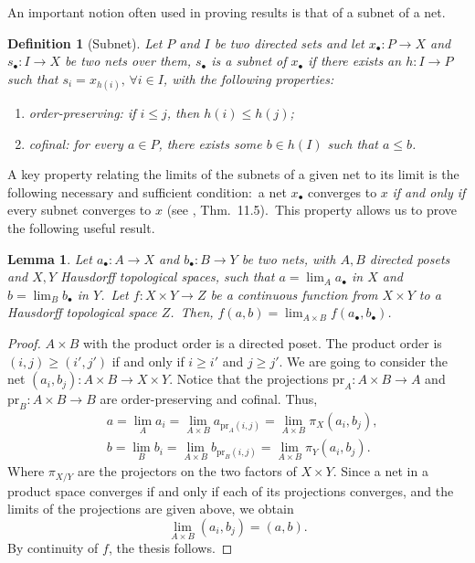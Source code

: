 \documentclass[11pt]{article}
\newtheorem{lemma}[proposition]{Lemma}
\newtheorem{definition}{Definition}[section]
\theoremstyle{definition}
\numberwithin{equation}{section}
\begin{document}
An important notion often used in proving results is that of a subnet of a net.
 \begin{definition}[Subnet]
 \label{def:subnet}
     Let $P$ and $I$ be two directed sets and let $x_{\bullet}:P\to X$ and $s_{\bullet}:I\to X$ be two nets over them, $s_{\bullet}$ is a \emph{subnet} of $x_{\bullet}$ if there exists an $h:I\to P$ such that $s_i=x_{h(i)},\,\forall i\in I$, with the following properties:
     \begin{enumerate}
         \item\emph{order-preserving:} if $i\leq j$, then $h(i)\leq h(j)$;
         \item\emph{cofinal:} for every $a\in P$, there exists some $b\in h(I)$ such that $a\leq b$.
     \end{enumerate}
 \end{definition}

 \noindent
 A key property relating the limits of the subnets of a given net to its limit is the following necessary and sufficient condition:~a net $x_{\bullet}$ converges to $x$ \emph{if and only if} every subnet converges to $x$ (see \cite{Willard_2004}, Thm.~11.5).~This property allows us to prove the following useful result.
\begin{lemma}
\label{lem:contProd}
    Let $a_{\bullet}:A\to X$ and $b_{\bullet}:B\to Y$ be two nets, with $A,B$ directed posets and $X,Y$ Hausdorff topological spaces, such that $a=\lim_A a_{\bullet}$ in $X$ and $b=\lim_B b_{\bullet}$ in $Y$.~Let $f:X\times Y\to Z$ be a continuous function from $X\times Y$ to a Hausdorff topological space $Z$.~Then, $f(a,b)=\lim_{A\times B}f(a_{\bullet},b_{\bullet})$.
\end{lemma}
\begin{proof}
    $A\times B$ with the product order is a directed poset. The product order is $(i,j)\geq (i',j')$ if and only if $i\geq i'$ and $j\geq j'$. We are going to consider the net $(a_i,b_j):A\times B\to X\times Y$. Notice that the projections $\mathrm{pr}_A:A\times B\to A$ and $\mathrm{pr}_B:A\times B\to B$ are order-preserving and cofinal. Thus,
    \begin{align*}
        &a=\lim_{A}a_{i}=\lim_{A\times B}a_{\mathrm{pr}_A (i,j)}=\lim_{A\times B}\pi_X(a_{i},b_j),\\
        &b=\lim_{B}b_{i}=\lim_{A\times B}b_{\mathrm{pr}_B (i,j)}=\lim_{A\times B}\pi_Y(a_{i},b_j).
    \end{align*}
    Where $\pi_{X/Y}$ are the projectors on the two factors of $X\times Y$. Since a net in a product space converges if and only if each of its projections converges, and the limits of the projections are given above, we obtain \[\lim_{A\times B}(a_i,b_j)=(a,b).\]
    By continuity of $f$, the thesis follows.
\end{proof}
\end{document}
